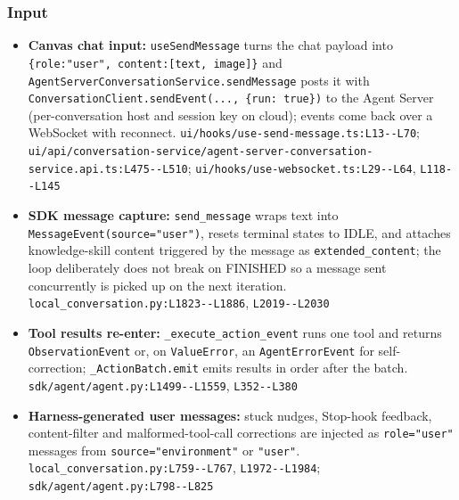 \subsubsection*{Input}
\begin{itemize}
\item \textbf{Canvas chat input:} \texttt{useSendMessage} turns the chat payload into \texttt{\{role:\allowbreak{}"user", content:\allowbreak{}[text, image]\}} and \texttt{AgentServerConversationService.\allowbreak{}sendMessage} posts it with \texttt{ConversationClient.\allowbreak{}sendEvent(\allowbreak{}.\allowbreak{}.\allowbreak{}.\allowbreak{}, \{run:\allowbreak{} true\})} to the Agent Server (per-conversation host and session key on cloud); events come back over a WebSocket with reconnect. \texttt{ui/\allowbreak{}hooks/\allowbreak{}use-\allowbreak{}send-\allowbreak{}message.\allowbreak{}ts:\allowbreak{}L13-\allowbreak{}-\allowbreak{}L70}; \texttt{ui/\allowbreak{}api/\allowbreak{}conversation-\allowbreak{}service/\allowbreak{}agent-\allowbreak{}server-\allowbreak{}conversation-\allowbreak{}service.\allowbreak{}api.\allowbreak{}ts:\allowbreak{}L475-\allowbreak{}-\allowbreak{}L510}; \texttt{ui/\allowbreak{}hooks/\allowbreak{}use-\allowbreak{}websocket.\allowbreak{}ts:\allowbreak{}L29-\allowbreak{}-\allowbreak{}L64}, \texttt{L118-\allowbreak{}-\allowbreak{}L145}
\item \textbf{SDK message capture:} \texttt{send\_\allowbreak{}message} wraps text into \texttt{MessageEvent(\allowbreak{}source="user")}, resets terminal states to IDLE, and attaches knowledge-skill content triggered by the message as \texttt{extended\_\allowbreak{}content}; the loop deliberately does not break on FINISHED so a message sent concurrently is picked up on the next iteration. \texttt{local\_\allowbreak{}conversation.\allowbreak{}py:\allowbreak{}L1823-\allowbreak{}-\allowbreak{}L1886}, \texttt{L2019-\allowbreak{}-\allowbreak{}L2030}
\item \textbf{Tool results re-enter:} \texttt{\_\allowbreak{}execute\_\allowbreak{}action\_\allowbreak{}event} runs one tool and returns \texttt{ObservationEvent} or, on \texttt{ValueError}, an \texttt{AgentErrorEvent} for self-correction; \texttt{\_\allowbreak{}ActionBatch.\allowbreak{}emit} emits results in order after the batch. \texttt{sdk/\allowbreak{}agent/\allowbreak{}agent.\allowbreak{}py:\allowbreak{}L1499-\allowbreak{}-\allowbreak{}L1559}, \texttt{L352-\allowbreak{}-\allowbreak{}L380}
\item \textbf{Harness-generated user messages:} stuck nudges, Stop-hook feedback, content-filter and malformed-tool-call corrections are injected as \texttt{role="user"} messages from \texttt{source="environment"} or \texttt{"user"}. \texttt{local\_\allowbreak{}conversation.\allowbreak{}py:\allowbreak{}L759-\allowbreak{}-\allowbreak{}L767}, \texttt{L1972-\allowbreak{}-\allowbreak{}L1984}; \texttt{sdk/\allowbreak{}agent/\allowbreak{}agent.\allowbreak{}py:\allowbreak{}L798-\allowbreak{}-\allowbreak{}L825}
\end{itemize}

